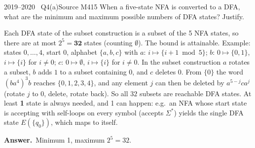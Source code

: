 \documentclass[11pt,a4paper]{article}
\newcommand{\ans}[1]{\par\smallskip\noindent\colorbox{mist}{\parbox{\dimexpr\linewidth-2\fboxsep}{\sffamily\small\textbf{\color{teal}Answer.}\ \color{ink}#1}}\par}
\begin{document}
\begin{question}{2019--2020 \textbullet\ Q4(a)}{Source M41}{5}
When a five-state NFA is converted to a DFA, what are the minimum and maximum possible numbers of DFA states? Justify.
\end{question}
\begin{solution}
Each DFA state of the subset construction is a subset of the 5 NFA states, so there are at most $2^5=\mathbf{32}$ states (counting $\emptyset$). The bound is attainable. Example: states $0,\dots,4$, start $0$, alphabet $\{a,b,c\}$ with $a$: $i\mapsto\{i+1 \bmod 5\}$; $b$: $0\mapsto\{0,1\}$, $i\mapsto\{i\}$ for $i\neq0$; $c$: $0\mapsto\emptyset$, $i\mapsto\{i\}$ for $i\neq0$. In the subset construction $a$ rotates a subset, $b$ adds $1$ to a subset containing $0$, and $c$ deletes $0$. From $\{0\}$ the word $(ba^4)^3b$ reaches $\{0,1,2,3,4\}$, and any element $j$ can then be deleted by $a^{5-j}ca^{j}$ (rotate $j$ to $0$, delete, rotate back). So all $32$ subsets are reachable DFA states.
At least \textbf{1} state is always needed, and 1 can happen: e.g.\ an NFA whose start state is accepting with self-loops on every symbol (accepts $\Sigma^*$) yields the single DFA state $E(\{q_0\})$, which maps to itself.
\ans{Minimum 1, maximum $2^5=32$.}
\end{solution}
\end{document}
